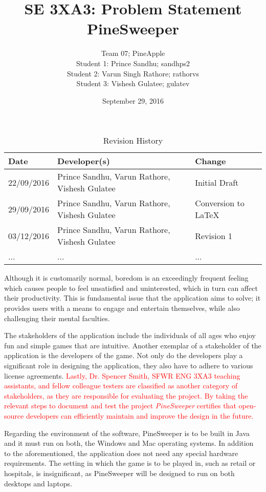 \documentclass{article}
\title{SE 3XA3: Problem Statement\\ PineSweeper}
\author{Team 07; PineApple
		\\ Student 1: Prince Sandhu; sandhps2
		\\ Student 2: Varun Singh Rathore; rathorvs
		\\ Student 3: Vishesh Gulatee; gulatev
}
\date{September 29, 2016}
\begin{document}
\begin{table}[hp]
\caption{Revision History} \label{TblRevisionHistory}
\begin{tabularx}{\textwidth}{llX}
\toprule
\textbf{Date} & \textbf{Developer(s)} & \textbf{Change}\\
\midrule
22/09/2016 & Prince Sandhu, Varun Rathore, Vishesh Gulatee & Initial Draft\\
29/09/2016 & Prince Sandhu, Varun Rathore, Vishesh Gulatee & Conversion to LaTeX\\
03/12/2016 & Prince Sandhu, Varun Rathore, Vishesh Gulatee & Revision 1\\
... & ... & ...\\
\bottomrule
\end{tabularx}
\end{table}
\newpage
\maketitle

\vspace{5mm}
Although it is customarily normal, boredom is an exceedingly frequent feeling which causes people to feel unsatisfied and uninterested,
which in turn can affect their productivity. This is fundamental issue that the application aims to solve; it provides users with a means to
engage and entertain themselves, while also challenging their mental faculties. \vspace{5mm}

The stakeholders of the application include the individuals of all ages who enjoy fun and simple games that are intuitive. Another exemplar
of a stakeholder of the application is the developers of the game. Not only do the developers play a significant role in designing the
application, they also have to adhere to various license agreements. \textcolor{red}{Lastly, Dr. Spencer Smith, SFWR ENG 3XA3 teaching
assistants, and fellow colleague testers are classified as another category of stakeholders, as they are responsible for evaluating the project.
By taking the relevant steps to document and test the project \textit{PineSweeper} certifies that open-source developers can efficiently 
maintain and improve the design in the future.} \vspace{5mm}

Regarding the environment of the software, PineSweeper is to be built in Java and it must run on both, the Windows and Mac operating
systems. In addition to the aforementioned, the application does not need any special hardware requirements. The setting in which the
game is to be played in, such as retail or hospitals, is insignificant, as PineSweeper will be designed to run on both desktops and laptops.
\end{document}
